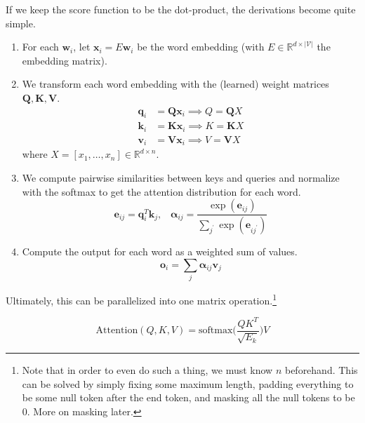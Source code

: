 \documentclass{article}
\begin{document}
    \begin{definition}
      If we keep the score function to be the dot-product, the derivations become quite simple. 
      \begin{enumerate}
        \item For each $\mathbf{w}_i$, let $\mathbf{x}_i = E \mathbf{w}_i$ be the word embedding (with $E \in \mathbb{R}^{d \times |\mathcal{V}|}$ the embedding matrix). 

        \item We transform each word embedding with the (learned) weight matrices $\mathbf{Q}, \mathbf{K}, \mathbf{V}$. 
        \begin{align*} 
          \mathbf{q}_i & = \mathbf{Q} \mathbf{x}_i \implies Q = \mathbf{Q} X \\
          \mathbf{k}_i & = \mathbf{K} \mathbf{x}_i \implies K = \mathbf{K} X \\
          \mathbf{v}_i & = \mathbf{V} \mathbf{x}_i \implies V = \mathbf{V} X 
        \end{align*}
        where $X = [x_1, \ldots, x_n] \in \mathbb{R}^{d \times n}$.  

        \item We compute pairwise similarities between keys and queries and normalize with the softmax to get the attention distribution for each word. 
          \begin{equation}
            \mathbf{e}_{ij} = \mathbf{q}_i^T \mathbf{k}_j , \;\;\; \boldsymbol{\alpha}_{ij} = \frac{\exp(\mathbf{e}_{ij})}{\sum_{j^\prime} \exp(\mathbf{e}_{i j^\prime})}
          \end{equation}

        \item Compute the output for each word as a weighted sum of values. 
          \begin{equation}
            \mathbf{o}_i = \sum_j \boldsymbol{\alpha}_{ij} \mathbf{v}_j 
          \end{equation}
      \end{enumerate}

      Ultimately, this can be parallelized into one matrix operation.\footnote{Note that in order to even do such a thing, we must know $n$ beforehand. This can be solved by simply fixing some maximum length, padding everything to be some null token after the end token, and masking all the null tokens to be $0$. More on masking later. } 

      \begin{equation} 
        \mathrm{Attention}(Q, K, V) = \mathrm{softmax} \bigg( \frac{Q K^T}{\sqrt{E_k}} \bigg) V
      \end{equation}


\end{definition}
\end{document}
